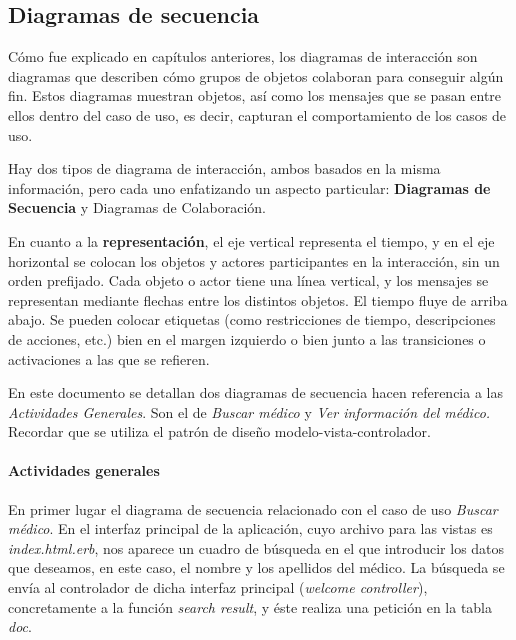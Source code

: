 
		\newpage
		\subsection{Diagramas de secuencia} %
	\label{sec:diagramas_de_secuencia}

		Cómo fue explicado en capítulos anteriores, los diagramas de interacción son diagramas que describen cómo grupos de objetos colaboran para conseguir algún fin. Estos diagramas muestran objetos, así como los mensajes que se pasan entre ellos dentro del caso de uso, es decir, capturan el comportamiento de los casos de uso.

		Hay dos tipos de diagrama de interacción, ambos basados en la misma información, pero cada uno enfatizando un aspecto particular: \textbf{Diagramas de Secuencia} y Diagramas de Colaboración.

		\medskip


		\medskip

		En cuanto a la \textbf{representación}, el eje vertical representa el tiempo, y en el eje horizontal se colocan los objetos y actores participantes en la interacción, sin un orden prefijado. Cada objeto o actor tiene una línea vertical, y los mensajes se representan mediante flechas entre los distintos objetos. El tiempo fluye de arriba abajo. Se pueden colocar etiquetas (como restricciones de tiempo, descripciones de acciones, etc.) bien en el margen izquierdo o bien junto a las transiciones o activaciones a las que se refieren. 

		En este documento se detallan dos diagramas de secuencia hacen referencia a las \textit{Actividades Generales}. Son el de \textit{Buscar médico} y \textit{Ver información del médico.} Recordar que se utiliza el patrón de diseño modelo-vista-controlador.

		\newpage
		\paragraph{Actividades generales} %
		\label{par:actividades_generales}
				En primer lugar el diagrama de secuencia relacionado con el caso de uso \textit{Buscar médico}. En el interfaz principal de la aplicación, cuyo archivo para las vistas es \textit{index.html.erb}, nos aparece un cuadro de búsqueda en el que introducir los datos que deseamos, en este caso, el nombre y los apellidos del médico. La búsqueda se envía al controlador de dicha interfaz principal (\textit{welcome controller}), concretamente a la función \textit{search result}, y éste realiza una petición en la tabla \textit{doc}.

